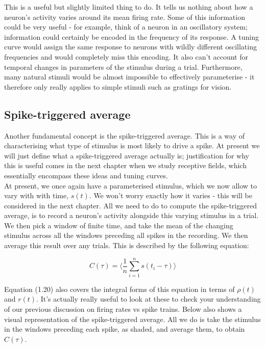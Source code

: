 \documentclass{article}
\begin{document}
This is a useful but slightly limited thing to do. It tells us nothing about how a neuron's activity varies around its mean firing rate. Some of this information could be very useful - for example, think of a neuron in an oscillatory system; information could certainly be encoded in the frequency of its response. A tuning curve would assign the same response to neurons with wildly different oscillating frequencies and would completely miss this encoding. It also can't account for temporal changes in parameters of the stimulus during a trial. Furthermore, many natural stimuli would be almost impossible to effectively parameterise - it therefore only really applies to simple stimuli such as gratings for vision.

\subsection{Spike-triggered average}

Another fundamental concept is the spike-triggered average. This is a way of characterising what type of stimulus is most likely to drive a spike. At present we will just define what a spike-triggered average actually is; justification for why this is useful comes in the next chapter when we study receptive fields, which essentially encompass these ideas and tuning curves.\\

At present, we once again have a parameterised stimulus, which we now allow to vary with with time, $s(t)$. We won't worry exactly how it varies - this will be considered in the next chapter. All we need to do to compute the spike-triggered average, is to record a neuron's activity alongside this varying stimulus in a trial. We then pick a window of finite time, and take the mean of the changing stimulus across all the windows preceding all spikes in the recording. We then average this result over any trials. This is described by the following equation:

\begin{equation*}
    C(\tau) = \langle\frac{1}{n}\sum_{i=1}^n s(t_i-\tau)\rangle
\end{equation*}

Equation (1.20) also covers the integral forms of this equation in terms of $\rho(t)$ and $r(t)$. It's actually really useful to look at these to check your understanding of our previous discussion on firing rates vs spike trains. Below also shows a visual representation of the spike-triggered average. All we do is take the stimulus in the windows preceding each spike, as shaded, and average them, to obtain $C(\tau)$.\\
\end{document}
